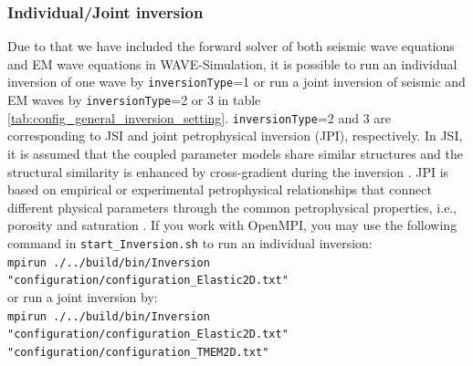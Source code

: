 \documentclass[pdftex,a4paper,parskip,listof=totoc,bibliography=totoc,onehalfspacing,12pt]{scrreprt}
\newcommand{\shellcmd}[1]{\indent\indent\texttt{#1}}	%
\newcommand{\shellcmdline}[1]{\indent\indent\texttt{\quad#1}} 	%
\begin{document}
\begin{table}[h!]
\end{table}

\subsubsection{Individual/Joint inversion} 
Due to that we have included the forward solver of both seismic wave equations and EM wave equations in WAVE-Simulation, it is possible to run an individual inversion of one wave by \verb+inversionType+=1 or run a joint inversion of seismic and EM waves by \verb+inversionType+=2 or 3 in table \ref{tab:config_general_inversion_setting}. \verb+inversionType+=2 and 3 are corresponding to JSI and joint petrophysical inversion (JPI), respectively. In JSI, it is assumed that the coupled parameter models share similar structures and the structural similarity is enhanced by cross-gradient during the inversion \citep{gallardo2003characterization}. JPI is based on empirical or experimental petrophysical relationships that connect different physical parameters through the common petrophysical properties, i.e., porosity and saturation \citep{qin2021joint}. If you work with OpenMPI, you may use the following command in \shellcmdline{start\_Inversion.sh} to run an individual inversion:\\
    \shellcmd{mpirun ./../build/bin/Inversion "configuration/configuration\_Elastic2D.txt"}\\
or run a joint inversion by:\\
    \shellcmd{mpirun ./../build/bin/Inversion "configuration/configuration\_Elastic2D.txt" "configuration/configuration\_TMEM2D.txt"}
    
\end{document}
